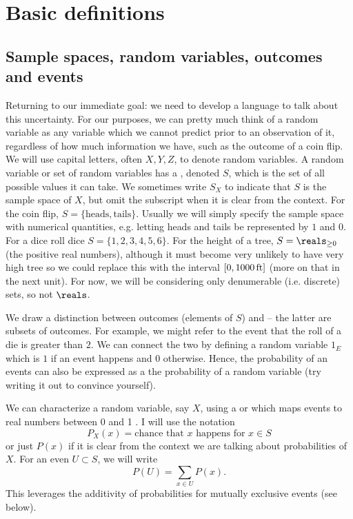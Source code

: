 \section{Basic definitions}
\subsection{Sample spaces, random variables, outcomes and events}
Returning to our immediate goal: we need to develop a language to talk about this uncertainty.
For our purposes, we can pretty much think of a random variable as any variable which we cannot predict prior to an observation of it, regardless of how much information we have, such as the outcome of a coin flip.  We will use capital letters, often $X,Y,Z$, to denote random variables. A random variable or set of random variables has a , denoted $S$, which is the set of all possible values it can take. We sometimes write $S_X$ to indicate that $S$ is the sample space of $X$, but omit the subscript when it is clear from the context.  For the coin flip, $S = \{\text{heads},\text{tails}\}$.  Usually we will simply specify the sample space with numerical quantities, e.g. letting heads and tails be represented by $1$ and $0$.   For a dice roll dice $S = \{1,2,3,4,5,6\}$. For the height of a tree, $S = \reals_{\ge 0}$ (the positive real numbers), although it must become very unlikely to have very high tree so we could replace this with the interval $[0,1000\,{\rm ft}]  $ (more on that in the next unit). For now, we will be considering only denumerable (i.e. discrete) sets, so not $\reals$. 
 

We draw a distinction  between outcomes (elements of $S$) and  -- the latter are subsets of outcomes. For example, we might refer to the event that the roll of a die is greater than $2$. We can connect the two by defining a random variable $1_E$ which is $1$ if an event happens and $0$ otherwise. Hence, the probability of an events can also be expressed as a the probability of a random variable (try writing it out to convince yourself). 

 
  
 We can characterize a random variable, say $X$, using  a  or which maps events to real numbers between 0 and 1 \cite[Definition 1.2.1]{evans}. I will use the notation 
\begin{equation*}
P_X(x) = \text{chance that $x$ happens for $x \in S$} 
\end{equation*}
or just $P(x)$ if it is clear from the context we are talking about probabilities of $X$. For an even $U \subset S$, we will write
\begin{equation}
P(U) = \sum_{x \in U}P(x).
\end{equation}
This leverages the additivity of probabilities for mutually exclusive events (see below).


